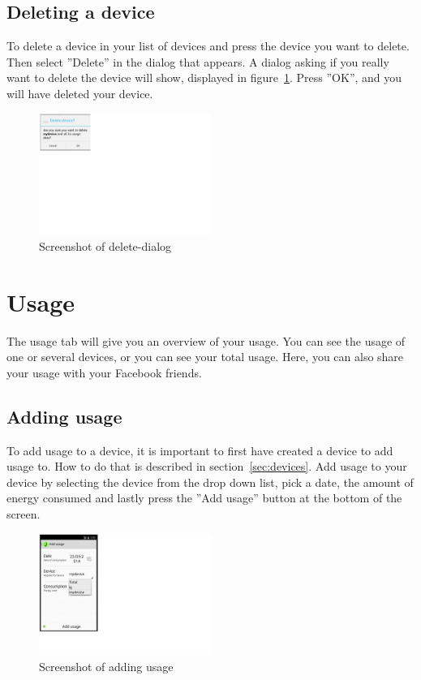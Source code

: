 \subsection{Deleting a device}
To delete a device in your list of devices and press the device you want to delete. Then select ''Delete'' in the dialog that appears. A dialog asking if you really want to delete the device will show, displayed in figure~\ref{fig:deleteDevice}. Press ''OK'', and you will have deleted your device.

\begin{figure}[H]
\centering
\includegraphics[width=0.5\textwidth, clip, trim=0cm 14cm 20cm 0cm]{appendix/usermanual/fig/ReallyDeleteDevice.png}
\caption{Screenshot of delete-dialog}
\label{fig:deleteDevice}
\end{figure}

\section{Usage}
The usage tab will give you an overview of your usage. You can see the usage of one or several devices, or you can see your total usage. Here, you can also share your usage with your Facebook friends.
\subsection{Adding usage}
To add usage to a device, it is important to first have created a device to add usage to. How to do that is described in section~\ref{sec:devices}. Add usage to your device by selecting the device from the drop down list, pick a date, the amount of energy consumed and lastly press the ''Add usage'' button at the bottom of the screen.

\begin{figure}[H]
\centering
\includegraphics[width=0.5\textwidth, clip, trim=0cm 4cm 19.5cm 0cm]{appendix/usermanual/fig/AddUsage.png}
\caption{Screenshot of adding usage}
\end{figure}


